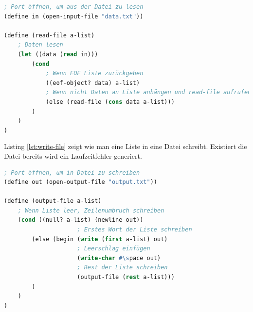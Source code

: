 \begin{lstlisting}[language=Lisp, caption=Datei lesen, label=lst:read-file]
; Port öffnen, um aus der Datei zu lesen
(define in (open-input-file "data.txt"))

(define (read-file a-list)
	; Daten lesen
	(let ((data (read in)))
		(cond
			; Wenn EOF Liste zurückgeben
			((eof-object? data) a-list)
			; Wenn nicht Daten an Liste anhängen und read-file aufrufen
			(else (read-file (cons data a-list)))
		)
	)
)
\end{lstlisting}

Listing \ref{lst:write-file} zeigt wie man eine Liste in eine Datei schreibt. Existiert die Datei bereits wird ein Laufzeitfehler generiert.

\begin{lstlisting}[language=Lisp, caption=Datei schreiben, label=lst:write-file]
; Port öffnen, um in Datei zu schreiben
(define out (open-output-file "output.txt"))

(define (output-file a-list)
	; Wenn Liste leer, Zeilenumbruch schreiben
	(cond ((null? a-list) (newline out))
					 ; Erstes Wort der Liste schreiben
		(else (begin (write (first a-list) out)
					 ; Leerschlag einfügen
					 (write-char #\space out)
					 ; Rest der Liste schreiben
					 (output-file (rest a-list)))
		)
	)
)
\end{lstlisting}

